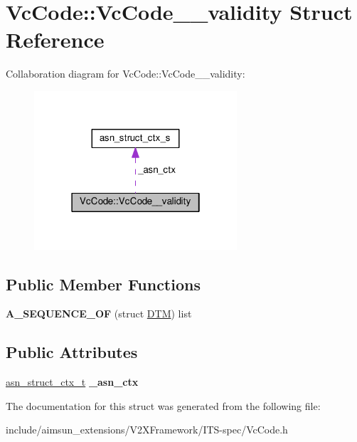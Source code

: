 \hypertarget{structVcCode_1_1VcCode____validity}{}\section{Vc\+Code\+:\+:Vc\+Code\+\_\+\+\_\+validity Struct Reference}
\label{structVcCode_1_1VcCode____validity}


Collaboration diagram for Vc\+Code\+:\+:Vc\+Code\+\_\+\+\_\+validity\+:\nopagebreak
\begin{figure}[H]
\begin{center}
\leavevmode
\includegraphics[width=214pt]{structVcCode_1_1VcCode____validity__coll__graph}
\end{center}
\end{figure}
\subsection*{Public Member Functions}
\begin{DoxyCompactItemize}
\item 
{\bfseries A\+\_\+\+S\+E\+Q\+U\+E\+N\+C\+E\+\_\+\+OF} (struct \hyperlink{structDTM}{D\+TM}) list\hypertarget{structVcCode_1_1VcCode____validity_ac81e52d863594280925fd5d69fdcd27d}{}\label{structVcCode_1_1VcCode____validity_ac81e52d863594280925fd5d69fdcd27d}

\end{DoxyCompactItemize}
\subsection*{Public Attributes}
\begin{DoxyCompactItemize}
\item 
\hyperlink{structasn__struct__ctx__s}{asn\+\_\+struct\+\_\+ctx\+\_\+t} {\bfseries \+\_\+asn\+\_\+ctx}\hypertarget{structVcCode_1_1VcCode____validity_a0bed1f750e2d690c1d502c899057d918}{}\label{structVcCode_1_1VcCode____validity_a0bed1f750e2d690c1d502c899057d918}

\end{DoxyCompactItemize}


The documentation for this struct was generated from the following file\+:\begin{DoxyCompactItemize}
\item 
include/aimsun\+\_\+extensions/\+V2\+X\+Framework/\+I\+T\+S-\/spec/Vc\+Code.\+h\end{DoxyCompactItemize}

